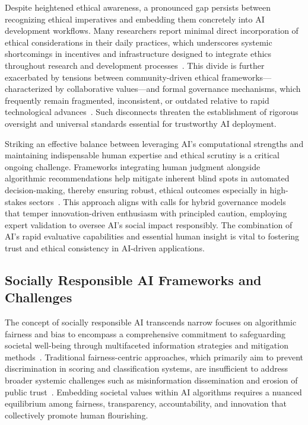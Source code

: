 \documentclass[sigconf]{acmart}
\begin{document}
Despite heightened ethical awareness, a pronounced gap persists between recognizing ethical imperatives and embedding them concretely into AI development workflows. Many researchers report minimal direct incorporation of ethical considerations in their daily practices, which underscores systemic shortcomings in incentives and infrastructure designed to integrate ethics throughout research and development processes~\cite{ref9,ref25}. This divide is further exacerbated by tensions between community-driven ethical frameworks—characterized by collaborative values—and formal governance mechanisms, which frequently remain fragmented, inconsistent, or outdated relative to rapid technological advances~\cite{ref25,ref36}. Such disconnects threaten the establishment of rigorous oversight and universal standards essential for trustworthy AI deployment.

Striking an effective balance between leveraging AI's computational strengths and maintaining indispensable human expertise and ethical scrutiny is a critical ongoing challenge. Frameworks integrating human judgment alongside algorithmic recommendations help mitigate inherent blind spots in automated decision-making, thereby ensuring robust, ethical outcomes especially in high-stakes sectors~\cite{ref2}. This approach aligns with calls for hybrid governance models that temper innovation-driven enthusiasm with principled caution, employing expert validation to oversee AI’s social impact responsibly. The combination of AI's rapid evaluative capabilities and essential human insight is vital to fostering trust and ethical consistency in AI-driven applications.

\subsection{Socially Responsible AI Frameworks and Challenges}

The concept of socially responsible AI transcends narrow focuses on algorithmic fairness and bias to encompass a comprehensive commitment to safeguarding societal well-being through multifaceted information strategies and mitigation methods~\cite{ref26}. Traditional fairness-centric approaches, which primarily aim to prevent discrimination in scoring and classification systems, are insufficient to address broader systemic challenges such as misinformation dissemination and erosion of public trust~\cite{ref26}. Embedding societal values within AI algorithms requires a nuanced equilibrium among fairness, transparency, accountability, and innovation that collectively promote human flourishing.
\end{document}
